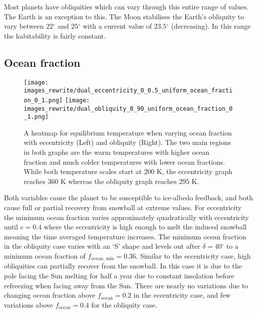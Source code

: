 \documentclass[12pt, onecolumn]{revtex4-2}    %
\newcommand{\degrees}{\ensuremath{^{\circ}}}
\begin{document}
Most planets have obliquities which can vary through this entire range of values.
The Earth is an exception to this. 
The Moon stabilises the Earth's obliquity to vary between $22\degrees$ and $25\degrees$ with a current value of $23.5\degrees$ (decreasing).
In this range the habitability is fairly constant.


\subsection{Ocean fraction} \label{ssec:qualitative_oceanfraction}
\begin{figure}
  \texttt{[image: images\_rewrite/dual\_eccentricity\_0\_0.5\_uniform\_ocean\_fraction\_0\_1.png]}
  \texttt{[image: images\_rewrite/dual\_obliquity\_0\_90\_uniform\_ocean\_fraction\_0\_1.png]}
  \caption{
    A heatmap for equilibrium temperature when varying ocean fraction with eccentricity (Left) and obliquity (Right).
    The two main regions in both graphs are the warm temperatures with higher ocean fraction and much colder temperatures with lower ocean fractions.
    While both temperature scales start at $200$ K, the eccentricity graph reaches $360$ K whereas the obliquity graph reaches $295$ K.
  }
  \label{fig:qualitative_oceanfraction}
\end{figure}

Both variables cause the planet to be susceptible to ice-albedo feedback, and both cause full or partial recovery from snowball at extreme values.
For eccentricity the minimum ocean fraction varies approximately quadratically with eccentricity until $e = 0.4$ where the eccentricity is high enough to melt the induced snowball meaning the time averaged temperature increases.
The minimum ocean fraction in the obliquity case varies with an `S' shape and levels out after $\delta = 40\degrees$ to a minimum ocean fraction of $f_\text{ocean, min} = 0.36$.
Similar to the eccentricity case, high obliquities can partially recover from the snowball. In this case it is due to the pole facing the Sun melting for half a year due to constant insolation before refreezing when facing away from the Sun.
There are nearly no variations due to changing ocean fraction above $f_\text{ocean} = 0.2$ in the eccentricity case, and few variations above $f_\text{ocean} = 0.4$ for the obliquity case.
\end{document}
